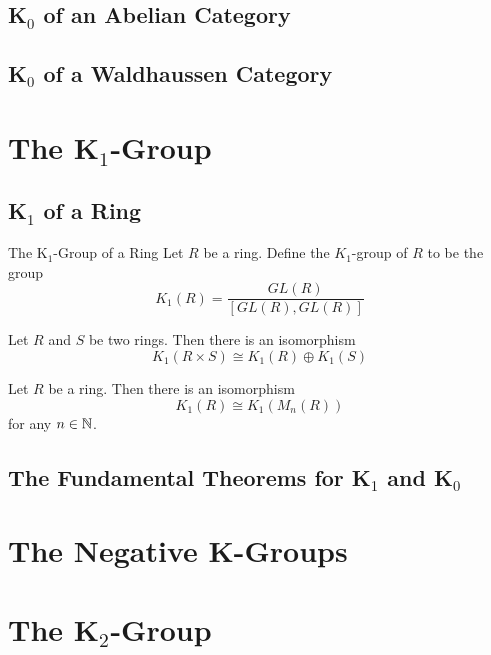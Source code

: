 \documentclass[a4paper]{article}
\begin{document}
\subsection{K${_0}$ of an Abelian Category}
\subsection{K${_0}$ of a Waldhaussen Category}

\pagebreak
\section{The K${_1}$-Group}
\subsection{K${_1}$ of a Ring}
\begin{defn}{The K${_1}$-Group of a Ring}{} Let $R$ be a ring. Define the $K_1$-group of $R$ to be the group $$K_1(R)=\frac{GL(R)}{[GL(R),GL(R)]}$$
\end{defn}

\begin{prp}{}{} Let $R$ and $S$ be two rings. Then there is an isomorphism $$K_1(R\times S)\cong K_1(R)\oplus K_1(S)$$
\end{prp}

\begin{prp}{}{} Let $R$ be a ring. Then there is an isomorphism $$K_1(R)\cong K_1(M_n(R))$$ for any $n\in\mathbb{N}$. 
\end{prp}

\subsection{The Fundamental Theorems for K${_1}$ and K${_0}$}

\pagebreak
\section{The Negative K-Groups}

\pagebreak
\section{The K${_2}$-Group}
\end{document}
